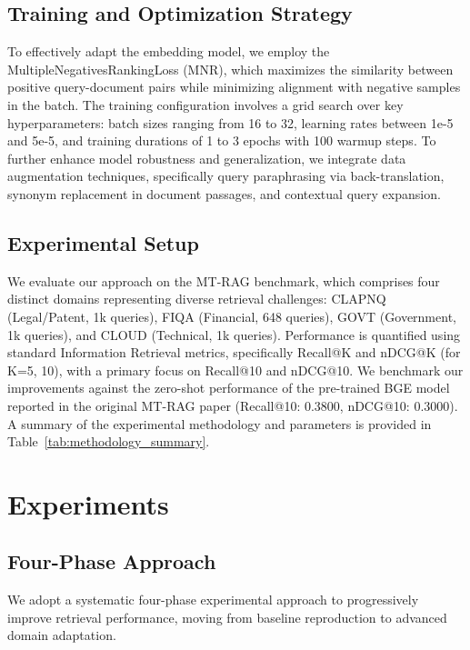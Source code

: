 \documentclass[11pt]{article}
\begin{document}
\subsection{Training and Optimization Strategy}
To effectively adapt the embedding model, we employ the MultipleNegativesRankingLoss (MNR), which maximizes the similarity between positive query-document pairs while minimizing alignment with negative samples in the batch. The training configuration involves a grid search over key hyperparameters: batch sizes ranging from 16 to 32, learning rates between 1e-5 and 5e-5, and training durations of 1 to 3 epochs with 100 warmup steps. To further enhance model robustness and generalization, we integrate data augmentation techniques, specifically query paraphrasing via back-translation, synonym replacement in document passages, and contextual query expansion.



\subsection{Experimental Setup}
We evaluate our approach on the MT-RAG benchmark, which comprises four distinct domains representing diverse retrieval challenges: CLAPNQ (Legal/Patent, 1k queries), FIQA (Financial, 648 queries), GOVT (Government, 1k queries), and CLOUD (Technical, 1k queries). Performance is quantified using standard Information Retrieval metrics, specifically Recall@K and nDCG@K (for K=5, 10), with a primary focus on Recall@10 and nDCG@10. We benchmark our improvements against the zero-shot performance of the pre-trained BGE model reported in the original MT-RAG paper (Recall@10: 0.3800, nDCG@10: 0.3000). A summary of the experimental methodology and parameters is provided in Table~\ref{tab:methodology_summary}.


\section{Experiments}

\subsection{Four-Phase Approach}

We adopt a systematic four-phase experimental approach to progressively improve retrieval performance, moving from baseline reproduction to advanced domain adaptation.
\end{document}
